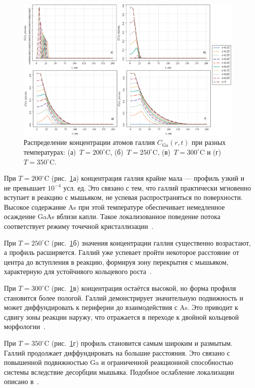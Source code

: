 \documentclass[14pt,oneside]{extarticle}
\begin{document}
\begin{figure}[H]
    \begin{center}
    \includegraphics[width=15cm]{images/C_Ga_t.png}
    \caption{\label{fig:c_ga_t} Распределение концентрации атомов галлия $C_{\text{Ga}}(r, t)$ при разных температурах: (а)~$T = 200^\circ$C, (б)~$T = 250^\circ$C, (в)~$T = 300^\circ$C и (г)~$T = 350^\circ$C.}
    \end{center}
\end{figure}

При $T = 200^\circ$C (рис.~\ref{fig:c_ga_t}а) концентрация галлия крайне мала — профиль узкий и не превышает $10^{-4}$ усл. ед. Это связано с тем, что галлий практически мгновенно вступает в реакцию с мышьяком, не успевая распространяться по поверхности. Высокое содержание As при этой температуре обеспечивает немедленное осаждение GaAs вблизи капли. Такое локализованное поведение потока соответствует режиму точечной кристаллизации~\cite{reyes2013}.

При $T = 250^\circ$C (рис.~\ref{fig:c_ga_t}б) значения концентрации галлия существенно возрастают, а профиль расширяется. Галлий уже успевает пройти некоторое расстояние от центра до вступления в реакцию, формируя зону перекрытия с мышьяком, характерную для устойчивого кольцевого роста~\cite{mano2005nano, fan2023}.

При $T = 300^\circ$C (рис.~\ref{fig:c_ga_t}в) концентрация остаётся высокой, но форма профиля становится более пологой. Галлий демонстрирует значительную подвижность и может диффундировать к периферии до взаимодействия с As. Это приводит к сдвигу зоны реакции наружу, что отражается в переходе к двойной кольцевой морфологии~\cite{mano2005nano}.

При $T = 350^\circ$C (рис.~\ref{fig:c_ga_t}г) профиль становится самым широким и размытым. Галлий продолжает диффундировать на большие расстояния. Это связано с повышенной подвижностью Ga и ограниченной реакционной способностью системы вследствие десорбции мышьяка. Подобное ослабление локализации описано в~\cite{fan2023evaporation, zheng2023droplet}.
\end{document}
